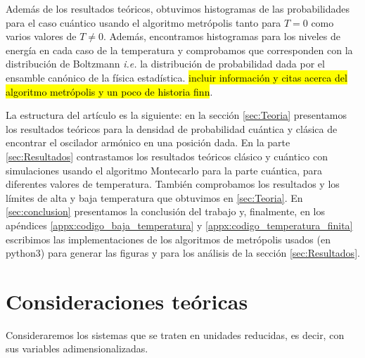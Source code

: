 \documentclass[%
 reprint,
 amsmath,amssymb,
 aps,
 pra,
]{revtex4-2}
\begin{document}
Además de los resultados teóricos, obtuvimos histogramas de las probabilidades para el caso cuántico usando el algoritmo metrópolis tanto para $T=0$ como varios valores de $T \neq 0$. Además, encontramos histogramas para los niveles de energía en cada caso de la temperatura y comprobamos que corresponden con la distribución de Boltzmann \textit{i.e.} la distribución de probabilidad dada por el ensamble canónico de la física estadística. \hl{incluir información y citas acerca del algoritmo metrópolis y un poco de historia finn}. 

La estructura del artículo es la siguiente: en la sección \ref{sec:Teoria} presentamos los resultados teóricos para la densidad de probabilidad cuántica y clásica de encontrar el oscilador armónico en una posición dada. En la parte \ref{sec:Resultados} contrastamos los resultados teóricos clásico y cuántico con simulaciones usando el algoritmo Montecarlo para la parte cuántica, para diferentes valores de temperatura. También comprobamos los resultados y los límites de alta y baja temperatura que obtuvimos en \ref{sec:Teoria}. En \ref{sec:conclusion} presentamos la conclusión del trabajo y, finalmente, en los apéndices \ref{appx:codigo_baja_temperatura} y \ref{appx:codigo_temperatura_finita} escribimos las implementaciones de los algoritmos de metrópolis usados (en python3) para generar las figuras y para los análisis de la sección \ref{sec:Resultados}. 


\section{\label{sec:Teoria}Consideraciones teóricas}

Consideraremos los sistemas que se traten en unidades reducidas, es decir, con sus variables adimensionalizadas.
\end{document}
